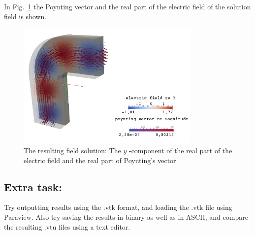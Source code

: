 In Fig.~\ref{fig:solution} the Poynting vector and the real part of the electric field of the solution field is shown.

\begin{figure}[htbp]
\centering
\includegraphics[width=0.8\textwidth]{result.pdf}
\caption{The resulting field solution: The $y$ -component of the real part of the electric field and the real part of Poynting's vector}
\label{fig:solution}
\end{figure}

\subsection*{Extra task:}

Try outputting results using the .vtk format, and loading the .vtk file using Paraview.  Also try saving the results in binary as well as in ASCII, and compare the resulting .vtu files using a text editor.

